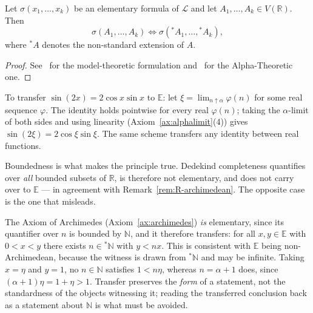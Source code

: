 \begin{theorem}
\label{thm:transfer}
Let $\sigma(x_1,\dots,x_k)$ be an elementary formula of $\mathcal{L}$ and let
$A_1,\dots,A_k \in V(\mathbb{R})$. Then
\begin{equation}
  \label{eq:transfer}
  \sigma(A_1,\dots,A_k) \iff \sigma({}^{*}A_1,\dots,{}^{*}A_k),
\end{equation}
where ${}^{*}A$ denotes the non-standard extension of $A$.
\end{theorem}

\begin{proof}
See~\cite{robinson1996nonstandard} for the model-theoretic formulation
and~\cite{benci2019measure,benci2022nonstandard} for the Alpha-Theoretic one.
\end{proof}

\begin{example}
To transfer $\sin(2x)=2\cos x\sin x$ to $\mathbb{E}$: let $\xi=\lim_{n\uparrow\alpha}
\varphi(n)$ for some real sequence $\varphi$. The identity holds pointwise for every
real $\varphi(n)$; taking the $\alpha$-limit of both sides and using linearity
(Axiom~\ref{ax:alphalimit}(4)) gives $\sin(2\xi)=2\cos\xi\sin\xi$. The same scheme
transfers any identity between real functions.
\end{example}

Boundedness is what makes the principle true. Dedekind completeness quantifies over
\emph{all} bounded subsets of $\mathbb{R}$, is therefore not elementary, and does not
carry over to $\mathbb{E}$ --- in agreement with Remark~\ref{rem:R-archimedean}. The
opposite case is the one that misleads.

\begin{remark}
\label{rem:transfer-scope}
The Axiom of Archimedes (Axiom~\ref{ax:archimedes}) \emph{is} elementary, since its
quantifier over $n$ is bounded by $\mathbb{N}$, and it therefore transfers: for all
$x,y \in \mathbb{E}$ with $0 < x < y$ there exists $n \in {}^{*}\mathbb{N}$ with
$y < nx$. This is consistent with $\mathbb{E}$ being non-Archimedean, because the
witness is drawn from ${}^{*}\mathbb{N}$ and may be infinite. Taking $x = \eta$ and
$y = 1$, no $n \in \mathbb{N}$ satisfies $1 < n\eta$, whereas $n = \alpha + 1$ does,
since $(\alpha+1)\eta = 1 + \eta > 1$. Transfer preserves the \emph{form} of a
statement, not the standardness of the objects witnessing it; reading the transferred
conclusion back as a statement about $\mathbb{N}$ is what must be avoided.
\end{remark}

